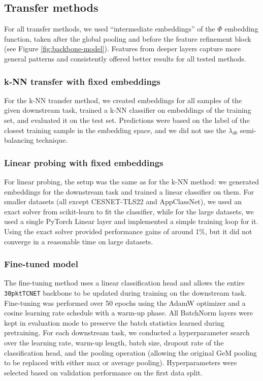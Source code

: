 \documentclass[lettersize,journal,twoside,article]{IEEEtran}
\begin{document}
\subsection{Transfer methods}
\label{sec:transfer-methods}
For all transfer methods, we used ``intermediate embeddings'' of the $\Phi$ embedding function, taken after the global pooling and before the feature refinement block (see Figure \ref{fig:backbone-model}). Features from deeper layers capture more general patterns and consistently offered better results for all tested methods.

\subsubsection{k-NN transfer with fixed embeddings}
For the k-NN transfer method, we created embeddings for all samples of the given downstream task, trained a k-NN classifier on embeddings of the training set, and evaluated it on the test set. Predictions were based on the label of the closest training sample in the embedding space, and we did not use the $\lambda_{db}$ semi-balancing technique. 

\subsubsection{Linear probing with fixed embeddings}
For linear probing, the setup was the same as for the k-NN method: we generated embeddings for the downstream task and trained a linear classifier on them. For smaller datasets (all except CESNET-TLS22 and AppClassNet), we used an exact solver from scikit-learn to fit the classifier, while for the large datasets, we used a single PyTorch Linear layer and implemented a simple training loop for it. Using the exact solver provided performance gains of around 1\%, but it did not converge in a reasonable time on large datasets.

\subsubsection{Fine-tuned model}
The fine-tuning method uses a linear classification head and allows the entire \texttt{30pktTCNET} backbone to be updated during training on the downstream task. Fine-tuning was performed over 50 epochs using the AdamW optimizer and a cosine learning rate schedule with a warm-up phase. All BatchNorm layers were kept in evaluation mode to preserve the batch statistics learned during pretraining. For each downstream task, we conducted a hyperparameter search over the learning rate, warm-up length, batch size, dropout rate of the classification head, and the pooling operation (allowing the original GeM pooling to be replaced with either max or average pooling). Hyperparameters were selected based on validation performance on the first data split.
\end{document}
